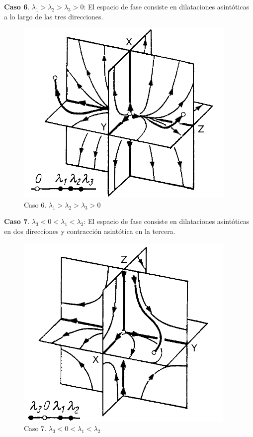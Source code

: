 \documentclass[a4paper,10pt]{article}
\numberwithin{equation}{section}
\begin{document}
\textbf{Caso 6}. $\lambda_1 > \lambda_2 > \lambda_3 > 0$: El espacio de fase consiste en dilataciones asintóticas
a lo largo de las tres direcciones.

\begin{figure}[H]
 \centering
\includegraphics[scale=0.35]{problema3fig7}
\caption{Caso 6. $\lambda_1 > \lambda_2 > \lambda_3 > 0$}
\label{fig:problema3fig7}
\end{figure}
\vspace{.3cm}

\textbf{Caso 7}. $\lambda_3 < 0 < \lambda_1 < \lambda_2$: El espacio de fase consiste en dilataciones asintóticas
en dos direcciones y contracción asintótica en la tercera.

\begin{figure}[H]
 \centering
\includegraphics[scale=0.35]{problema3fig8}
\caption{Caso 7. $\lambda_3 < 0 < \lambda_1 < \lambda_2$}
\label{fig:problema3fig8}
\end{figure}
\vspace{.3cm}
\end{document}
